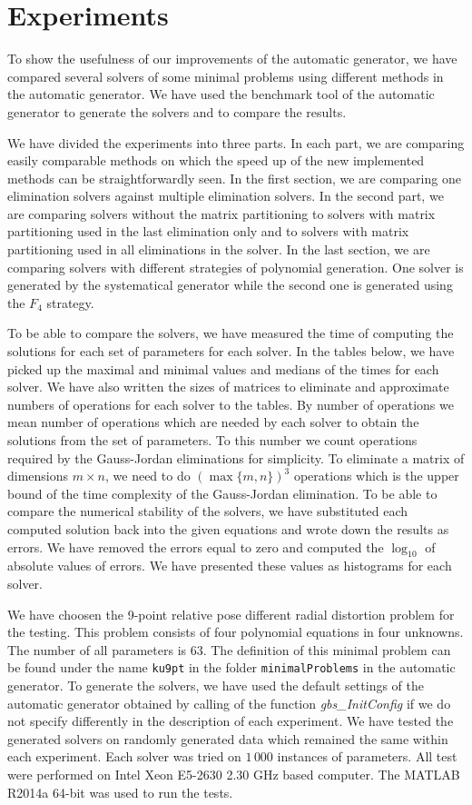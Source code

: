 \chapter{Experiments}
To show the usefulness of our improvements of the automatic generator, we have compared several solvers of some minimal problems using different methods in the automatic generator. We have used the benchmark tool of the automatic generator to generate the solvers and to compare the results.

We have divided the experiments into three parts. In each part, we are comparing easily comparable methods on which the speed up of the new implemented methods can be straightforwardly seen. In the first section, we are comparing one elimination solvers against multiple elimination solvers. In the second part, we are comparing solvers without the matrix partitioning to solvers with matrix partitioning used in the last elimination only and to solvers with matrix partitioning used in all eliminations in the solver. In the last section, we are comparing solvers with different strategies of polynomial generation. One solver is generated by the systematical generator while the second one is generated using the $F_4$ strategy.

To be able to compare the solvers, we have measured the time of computing the solutions for each set of parameters for each solver. In the tables below, we have picked up the maximal and minimal values and medians of the times for each solver. We have also written the sizes of matrices to eliminate and approximate numbers of operations for each solver to the tables. By number of operations we mean number of operations which are needed by each solver to obtain the solutions from the set of parameters. To this number we count operations required by the Gauss-Jordan eliminations for simplicity. To eliminate a matrix of dimensions $m \times n$, we need to do $(\max\{m, n\})^3$ operations which is the upper bound of the time complexity of the Gauss-Jordan elimination. To be able to compare the numerical stability of the solvers, we have substituted each computed solution back into the given equations and wrote down the results as errors. We have removed the errors equal to zero and computed the $\log_{10}$ of absolute values of errors. We have presented these values as histograms for each solver.

We have choosen the 9-point relative pose different radial distortion problem \cite{9pt} for the testing. This problem consists of four polynomial equations in four unknowns. The number of all parameters is 63. The definition of this minimal problem can be found under the name \texttt{ku9pt} in the folder \texttt{minimalProblems} in the automatic generator. To generate the solvers, we have used the default settings of the automatic generator obtained by calling of the function \textit{gbs\_InitConfig} if we do not specify differently in the description of each experiment. We have tested the generated solvers on randomly generated data which remained the same within each experiment. Each solver was tried on $1\,000$ instances of parameters. All test were performed on Intel Xeon E5-2630 2.30 GHz based computer. The MATLAB R2014a 64-bit was used to run the tests.

